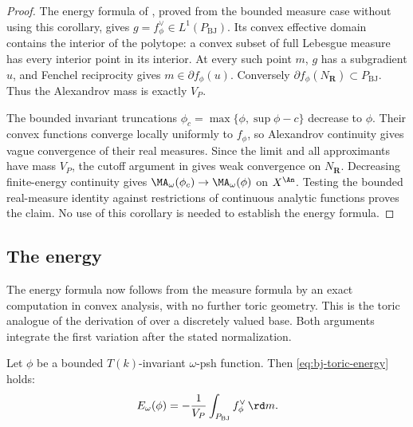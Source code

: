 \begin{proof}
The energy formula of , proved
from the bounded measure case without using this corollary, gives $g=f_\phi^\vee\in L^1(P_{\mathrm{BJ}})$.
Its convex effective domain contains the interior of the polytope:
a convex subset of full Lebesgue measure has every interior point
in its interior.  At every such point $m$, $g$ has a subgradient
$u$, and Fenchel reciprocity gives $m\in\partial f_\phi(u)$.
Conversely $\partial f_\phi(N_{\mathbf R})\subset P_{\mathrm{BJ}}$.
Thus the Alexandrov mass is exactly $V_P$.

The bounded invariant truncations
$\phi_c=\max\{\phi,\sup\phi-c\}$ decrease to $\phi$.
Their convex functions converge locally uniformly to $f_\phi$,
so Alexandrov continuity gives vague convergence of their real measures.
Since the limit and all approximants have mass $V_P$, the cutoff
argument in  gives weak convergence
on $N_{\mathbf R}$.  Decreasing finite-energy continuity gives
$\MA_\omega(\phi_c)\to\MA_\omega(\phi)$ on $X^{\An}$.
Testing the bounded real-measure identity against restrictions of
continuous analytic functions proves the claim.
No use of this corollary is needed to establish the energy formula.
\end{proof}

\subsection{The energy}
\label{sec:ch49-toric-energy}

The energy formula now follows from the measure formula by an exact
computation in convex analysis, with no further toric geometry.  This is
the toric analogue of the derivation of  over a
discretely valued base.  Both arguments integrate the first variation after the stated
normalization.

\begin{proposition}
\label{prop:ch49-toric-energy-bounded}
Let $\phi$ be a bounded $T(k)$-invariant $\omega$-psh function.
Then \eqref{eq:bj-toric-energy} holds:
\[
 E_\omega(\phi)=-\frac1{V_P}\int_{P_{\mathrm{BJ}}}f_\phi^\vee\,\rd m .
\]
\end{proposition}

